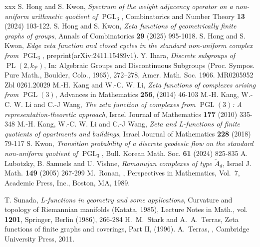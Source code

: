 \documentclass[11pt]{amsart}
\theoremstyle{definition}
\theoremstyle{remark}
\numberwithin{equation}{section}
\begin{document}
\begin{thebibliography}{xxx}
   S. Hong and S. Kwon, \emph{Spectrum of the weight adjacency operator on a non-uniform arithmetic quotient of $\operatorname{\operatorname{PGL}}_3$}, Combinatorics and Number Theory \textbf{13} (2024) 103-122.
   S. Hong and S. Kwon, \emph{Zeta functions of geometrically finite graphs of groups}, Annals of Combinatorics \textbf{29} (2025) 995-1018.
   S. Hong and S. Kwon, \emph{Edge zeta function and closed cycles in the standard non-uniform complex from $\operatorname{\operatorname{PGL}}_3$}, preprint(arXiv:2411.15489v1).
 Y. Ihara, \emph{Discrete subgroups of $\operatorname{PL}(2, k_\mathcal{P})$}, In: Algebraic Groups and Discontinuous Subgroups (Proc. Sympos. Pure Math., Boulder, Colo., 1965), 272–278, Amer. Math. Soc. 1966. MR0205952 Zbl 0261.20029
   M.-H. Kang and W.-C. W. Li, \emph{Zeta functions of complexes arising from $\operatorname{PGL}(3)$}, Advances in Mathematics \textbf{256}, (2014) 46-103
 M.-H. Kang, W.-C. W. Li and C.-J Wang, \emph{The zeta function of complexes from $\operatorname{PGL}(3)$: A representation-theoretic approach}, Israel Journal of Mathematics \textbf{177} (2010) 335-348
 M.-H. Kang, W.-C. W. Li and C.-J Wang, \emph{Zeta and L-functions of finite quotients of apartments and buildings}, Israel Journal of Mathematics \textbf{228} (2018) 79-117
  S. Kwon, \emph{Transition probability of a discrete geodesic flow on the standard non-uniform quotient of $\operatorname{PGL}_3$}, Bull. Korean Math. Soc. \textbf{61} (2024) 825-835
 A. Lubotzky, B. Samuels and U. Vishne, \emph{Ramanujan complexes of type $\widetilde{A}_d$}, Israel J. Math. \textbf{149} (2005) 267-299
M.~Ronan,
,
\newblock Perspectives in Mathematics, Vol.~7,
\newblock Academic Press, Inc., Boston, MA, 1989.

 T. Sunada, \emph{L-functions in geometry and some applications}, Curvature and topology of Riemannian manifolds (Katata, 1985), Lecture Notes in Math., vol. \textbf{1201}, Springer, Berlin (1986), 266-284
H.~M.~Stark and A.~A.~Terras,
\newblock Zeta functions of finite graphs and coverings, Part I$\!$I,
\newblock (1996).  
A.~Terras,
,
\newblock Cambridge University Press, 2011.




\end{thebibliography}
\end{document}
